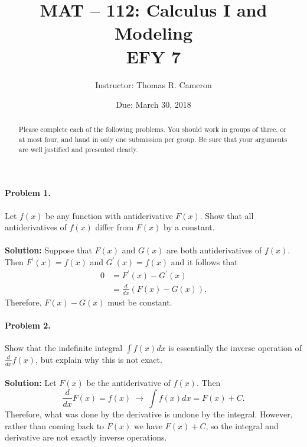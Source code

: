 \documentclass{article}
\title{MAT -- 112: Calculus I and Modeling\\
\large{EFY 7}}
\author{Instructor: Thomas R. Cameron}
\date{Due: March 30, 2018}
\begin{document}
\maketitle

\begin{abstract}
Please complete each of the following problems. You should work in groups of three, or at most four, and hand in only one submission per group. Be sure that your arguments are well justified and presented clearly.
\end{abstract}

\paragraph*{Problem 1.} Let $f(x)$ be any function with antiderivative $F(x)$. Show that all antiderivatives of $f(x)$ differ from $F(x)$ by a constant. 
~\\~\\
\textbf{Solution:} Suppose that $F(x)$ and $G(x)$ are both antiderivatives of $f(x)$. Then $F^{'}(x)=f(x)$ and $G^{'}(x)=f(x)$ and it follows that
\begin{align*}
0&=F^{'}(x)-G^{'}(x) \\
&=\frac{d}{dx}\left(F(x)-G(x)\right).
\end{align*}
Therefore, $F(x)-G(x)$ must be constant. 

\paragraph*{Problem 2.} Show that the indefinite integral $\int f(x)dx$ is essentially the inverse operation of $\frac{d}{dx}f(x)$, but explain why this is not exact.
~\\~\\
\textbf{Solution:} Let $F(x)$ be the antiderivative of $f(x)$. Then
\[
\frac{d}{dx}F(x)=f(x)~\rightarrow~\int f(x)dx=F(x)+C.
\]
Therefore, what was done by the derivative is undone by the integral. However, rather than coming back to $F(x)$ we have $F(x)+C$, so the integral and derivative are not exactly inverse operations. 
\end{document}

